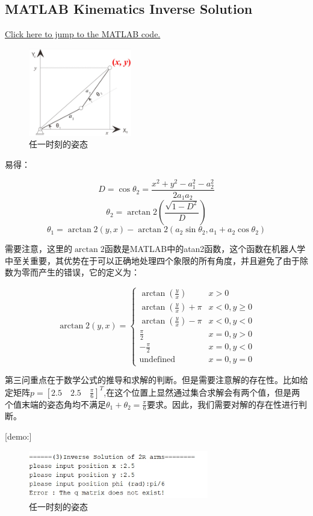 \documentclass{ctexart}
\begin{document}
\subsection{MATLAB Kinematics Inverse Solution}
\href{src/Rhw1_3_main.m}{Click here to jump to the MATLAB code.}

\begin{figure}[h]
	\centering
	\includegraphics[width=0.4\textwidth]{Image/formula.png}
	\caption{任一时刻的姿态}
\end{figure}

易得：

$$D=\cos \theta_2 = \frac{x^2+y^2-a_1^2-a_2^2}{2a_1a_2}$$
$$\theta_2 = \arctan2(\frac{\sqrt{1-D^2}}{D})$$
$$\theta_1 = \arctan2(y,x) - \arctan2(a_2\sin\theta_2,a_1+a_2\cos\theta_2)$$

需要注意，这里的$\arctan2$函数是MATLAB中的atan2函数，这个函数在机器人学中至关重要，其优势在于可以正确地处理四个象限的所有角度，并且避免了由于除数为零而产生的错误，它的定义为：

$$\arctan2(y,x) = \begin{cases}
	\arctan(\frac{y}{x}) & x>0 \\
	\arctan(\frac{y}{x})+\pi & x<0,y\geq 0 \\
	\arctan(\frac{y}{x})-\pi & x<0,y<0 \\
	\frac{\pi}{2} & x=0,y>0 \\
	-\frac{\pi}{2} & x=0,y<0 \\
	\text{undefined} & x=0,y=0		
\end{cases}$$															

第三问重点在于数学公式的推导和求解的判断。但是需要注意解的存在性。比如给定矩阵$p=[2.5\quad 2.5\quad \frac{\pi}{6}]^T$,在这个位置上显然通过集合求解会有两个值，但是两个值末端的姿态角均不满足$\theta_1+\theta_2=\frac{\pi}{6}$要求。因此，我们需要对解的存在性进行判断。
\newpage

[demo:]
\begin{figure}[h]
	\centering
	\includegraphics[width=0.7\textwidth]{Image/3.png}
	\caption{任一时刻的姿态}
\end{figure}
\end{document}
